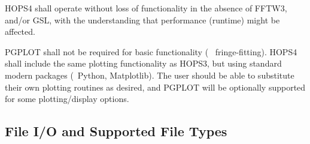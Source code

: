 \begin{description}

 HOPS4 shall operate without loss of functionality in the absence of
FFTW3, and/or GSL, with the understanding that performance (runtime) might be
affected. 

 \acs{PGPLOT} shall not be required for basic functionality (\eg~
fringe-fitting). HOPS4 shall include the same plotting functionality as HOPS3, 
but using standard modern packages (\eg~Python, Matplotlib). The user should 
be able to substitute their own plotting routines as desired, and \acs{PGPLOT} 
will be optionally supported for some plotting/display options.

\end{description}





\subsection{File I/O and Supported File Types}
\label{sec:ioreq}

